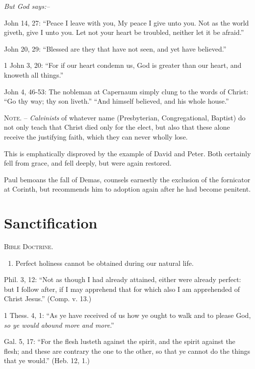 \documentclass[
]{book}
\providecommand{\tightlist}{%
  \setlength{\itemsep}{0pt}\setlength{\parskip}{0pt}}
\begin{document}
\textsl{But God says:--}

John 14, 27: ``Peace I leave with you, My peace I give unto you. Not as the world giveth, give I unto you. Let not your heart be troubled, neither let it be afraid.''

John 20, 29: ``Blessed are they that have not seen, and yet have believed.''

1 John 3, 20: ``For if our heart condemn us, God is greater than our heart, and knoweth all things.''

John 4, 46-53: The nobleman at Capernaum simply clung to the words of Christ: ``Go thy way; thy son liveth.'' ``And himself believed, and his whole house.''

\textsc{Note.} -- \emph{Calvinists} of whatever name (Presbyterian, Congregational, Baptist) do not only teach that Christ died only for the elect, but also that these alone receive the justifying faith, which they can never wholly lose.

This is emphatically disproved by the example of David and Peter. Both certainly fell from grace, and fell deeply, but were again restored.

Paul bemoans the fall of Demas, counsels earnestly the exclusion of the fornicator at Corinth, but recommends him to adoption again after he had become penitent.

\section{Sanctification}\label{sanctification}

\begin{center}
\textsc{Bible Doctrine.}
\end{center}

\begin{enumerate}
\def\labelenumi{\alph{enumi}.}
\tightlist
\item
  Perfect holiness cannot be obtained during our natural life.
\end{enumerate}

Phil. 3, 12: ``Not as though I had already attained, either were already perfect: but I follow after, if I may apprehend that for which also I am apprehended of Christ Jesus.'' (Comp. v. 13.)

1 Thess. 4, 1: ``As ye have received of us how ye ought to walk and to please God, \emph{so ye would abound more and more}.''

Gal. 5, 17: ``For the flesh lusteth against the spirit, and the spirit against the flesh; and these are contrary the one to the other, so that ye cannot do the things that ye would.'' (Heb. 12, 1.)
\end{document}

